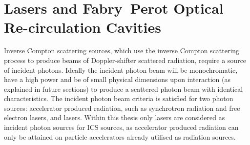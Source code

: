 \documentclass[../main.tex]{subfiles}
\begin{document}
\section{Lasers and Fabry--Perot Optical Re-circulation Cavities}
\label{sec:lasers_fabry_perot}

Inverse Compton scattering sources, which use the inverse Compton scattering process to produce beams of Doppler-shifter scattered radiation, require a source of incident photons. Ideally the incident photon beam will be monochromatic, have a high power and be of small physical dimensions upon interaction (as explained in future sections) to produce a scattered photon beam with identical characteristics. The incident photon beam criteria is satisfied for two photon sources: accelerator produced radiation, such as synchrotron radiation and free electron lasers, and lasers. Within this thesis only lasers are considered as incident photon sources for ICS sources, as accelerator produced radiation can only be attained on particle accelerators already utilised as radiation sources.
\end{document}
